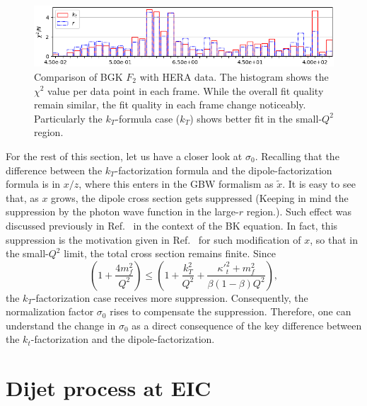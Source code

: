 \documentclass[11pt]{article}
\numberwithin{equation}{section}
\numberwithin{table}{section}
\numberwithin{figure}{section}
\begin{document}
\begin{figure}[p]
\includegraphics[width=\textwidth]{./plots/Figure_2-3.png}
\caption{Comparison of BGK $F_2$ with HERA data. The histogram shows the $\chi^2$ value per data point in each frame. While the overall fit quality remain similar, the fit quality in each frame change noticeably. Particularly the $k_T$-formula case ($k_T$) shows better fit in the small-$Q^2$ region.}
\label{fig:BGK-Grid}
\end{figure}
For the rest of this section, let us have a closer look at $\sigma_0$. 
Recalling that the difference between the $k_T$-factorization formula and the dipole-factorization formula is in $x/z$, where this enters in the GBW formalism as $\tilde{x}$. It is easy to see that, as $x$ grows, the dipole cross section gets suppressed (Keeping in mind the suppression by the photon wave function in the large-$r$ region.). Such effect was discussed previously in Ref.~\cite{Kutak:2004ym} in the context of the BK equation. In fact, this suppression is the motivation given in Ref.~\cite{Golec-Biernat:1998zce} for such modification of $x$, so that in the small-$Q^2$ limit, the total cross section remains finite.    
Since 
\begin{equation}
\left(1+\frac{4 m_f^2}{Q^2}\right)\leq\left(1+\frac{k_T^2}{Q^2}+\frac{{\kappa'}_t^2+m_f^2}{\beta(1-\beta)Q^2}\right),
\end{equation}
the $k_T$-factorization case receives more suppression. Consequently, the normalization factor $\sigma_0$ rises to compensate the suppression. 
Therefore, one can understand the change in $\sigma_0$ as a direct consequence of the key difference between the $k_t$-factorization and the dipole-factorization.
%
\section{Dijet process at EIC}
\label{Dijet process at EIC}
%
\end{document}
